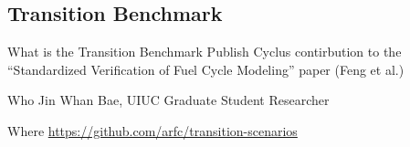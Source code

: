 \subsection{Transition Benchmark}
\begin{frame}
\begin{block}{What is the Transition Benchmark}
        Publish Cyclus contirbution to the ``Standardized Verification of Fuel 
        Cycle Modeling'' paper (Feng et al.)
\end{block}

\begin{block}{Who}
Jin Whan Bae, UIUC Graduate Student Researcher
\end{block}

\begin{block}{Where}
        \url{https://github.com/arfc/transition-scenarios} 

\end{block}

\end{frame}

